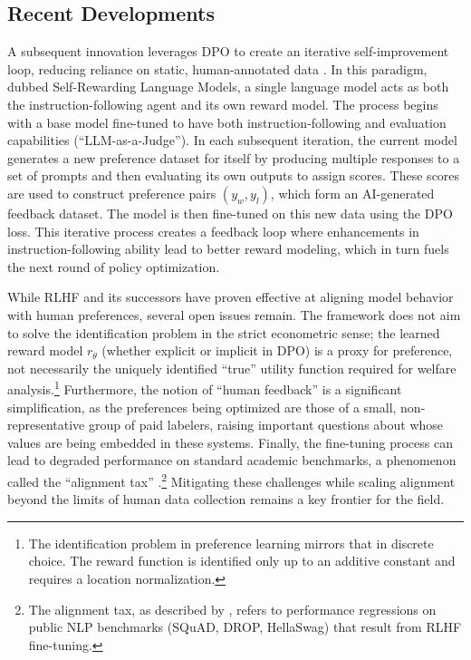 \subsection{Recent Developments}

A subsequent innovation leverages DPO to create an iterative self-improvement loop, reducing reliance on static, human-annotated data \citep{yuan2024self}. In this paradigm, dubbed Self-Rewarding Language Models, a single language model acts as both the instruction-following agent and its own reward model. The process begins with a base model fine-tuned to have both instruction-following and evaluation capabilities (``LLM-as-a-Judge''). In each subsequent iteration, the current model generates a new preference dataset for itself by producing multiple responses to a set of prompts and then evaluating its own outputs to assign scores. These scores are used to construct preference pairs $(y_w, y_l)$, which form an AI-generated feedback dataset. The model is then fine-tuned on this new data using the DPO loss. This iterative process creates a feedback loop where enhancements in instruction-following ability lead to better reward modeling, which in turn fuels the next round of policy optimization.

While RLHF and its successors have proven effective at aligning model behavior with human preferences, several open issues remain. The framework does not aim to solve the identification problem in the strict econometric sense; the learned reward model $r_\theta$ (whether explicit or implicit in DPO) is a proxy for preference, not necessarily the uniquely identified ``true'' utility function required for welfare analysis.\footnote{The identification problem in preference learning mirrors that in discrete choice. The reward function is identified only up to an additive constant and requires a location normalization.} Furthermore, the notion of ``human feedback'' is a significant simplification, as the preferences being optimized are those of a small, non-representative group of paid labelers, raising important questions about whose values are being embedded in these systems. Finally, the fine-tuning process can lead to degraded performance on standard academic benchmarks, a phenomenon called the ``alignment tax'' \citep{ouyang2022training}.\footnote{The alignment tax, as described by \citet{ouyang2022training}, refers to performance regressions on public NLP benchmarks (SQuAD, DROP, HellaSwag) that result from RLHF fine-tuning.} Mitigating these challenges while scaling alignment beyond the limits of human data collection remains a key frontier for the field.


